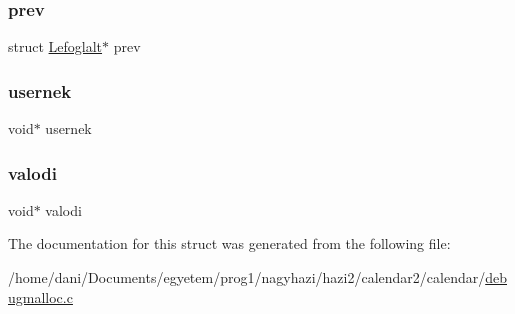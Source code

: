 \subsubsection{\texorpdfstring{prev}{prev}}
{\footnotesize\ttfamily struct \hyperlink{struct_lefoglalt}{Lefoglalt}$\ast$ prev}

\mbox{\label{struct_lefoglalt_a58c09d4017310a90fad327e926330b96}} 
\subsubsection{\texorpdfstring{usernek}{usernek}}
{\footnotesize\ttfamily void$\ast$ usernek}

\mbox{\label{struct_lefoglalt_a59522ad17870bd526fae5bbbc8125966}} 
\subsubsection{\texorpdfstring{valodi}{valodi}}
{\footnotesize\ttfamily void$\ast$ valodi}



The documentation for this struct was generated from the following file\+:\begin{DoxyCompactItemize}
\item 
/home/dani/\+Documents/egyetem/prog1/nagyhazi/hazi2/calendar2/calendar/\hyperlink{debugmalloc_8c}{debugmalloc.\+c}\end{DoxyCompactItemize}
